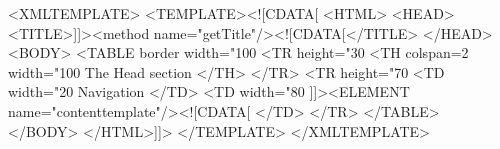 <XMLTEMPLATE>
<TEMPLATE><![CDATA[
    <HTML>
        <HEAD>
            <TITLE>]]><method name="getTitle"/><![CDATA[</TITLE>
        </HEAD>
        <BODY>
            <TABLE border width="100%
                <TR height="30%
                    <TH colspan=2 width="100%
                        The Head section
                    </TH>
                </TR>
                <TR height="70%
                    <TD width="20%
                        Navigation
                    </TD>
                    <TD width="80%
                        ]]><ELEMENT name="contenttemplate"/><![CDATA[
                    </TD>
                </TR>
            </TABLE>
        </BODY>
    </HTML>]]>
</TEMPLATE>
</XMLTEMPLATE>
